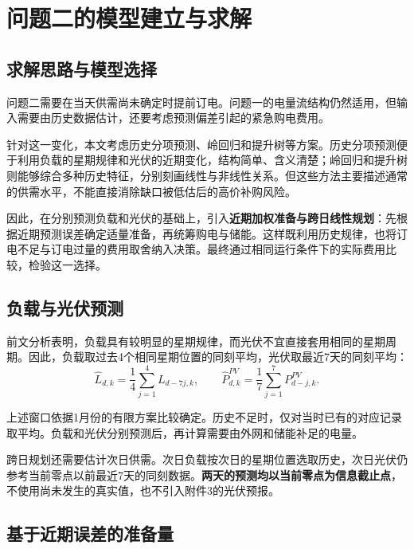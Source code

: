 \section{问题二的模型建立与求解}

\subsection{求解思路与模型选择}

问题二需要在当天供需尚未确定时提前订电。问题一的电量流结构仍然适用，但输入需要由历史数据估计，还要考虑预测偏差引起的紧急购电费用。

针对这一变化，本文考虑历史分项预测、岭回归和提升树等方案。历史分项预测便于利用负载的星期规律和光伏的近期变化，结构简单、含义清楚；岭回归和提升树则能够综合多种历史特征，分别刻画线性与非线性关系。但这些方法主要描述通常的供需水平，不能直接消除缺口被低估后的高价补购风险。

因此，在分别预测负载和光伏的基础上，引入\textbf{近期加权准备与跨日线性规划}：先根据近期预测误差确定适量准备，再统筹购电与储能。这样既利用历史规律，也将订电不足与订电过量的费用取舍纳入决策。最终通过相同运行条件下的实际费用比较，检验这一选择。

\subsection{负载与光伏预测}

前文分析表明，负载具有较明显的星期规律，而光伏不宜直接套用相同的星期周期。因此，负载取过去4个相同星期位置的同刻平均，光伏取最近7天的同刻平均：
\begin{equation}
\widehat L_{d,k}=\frac{1}{4}\sum_{j=1}^{4}L_{d-7j,k},
\qquad
\widehat P^{PV}_{d,k}=\frac{1}{7}\sum_{j=1}^{7}P^{PV}_{d-j,k}.
\label{eq:q2_forecast}
\end{equation}

上述窗口依据1月份的有限方案比较确定。历史不足时，仅对当时已有的对应记录取平均。负载和光伏分别预测后，再计算需要由外网和储能补足的电量。

跨日规划还需要估计次日供需。次日负载按次日的星期位置选取历史，次日光伏仍参考当前零点以前最近7天的同刻数据。\textbf{两天的预测均以当前零点为信息截止点}，不使用尚未发生的真实值，也不引入附件3的光伏预报。

\subsection{基于近期误差的准备量}

